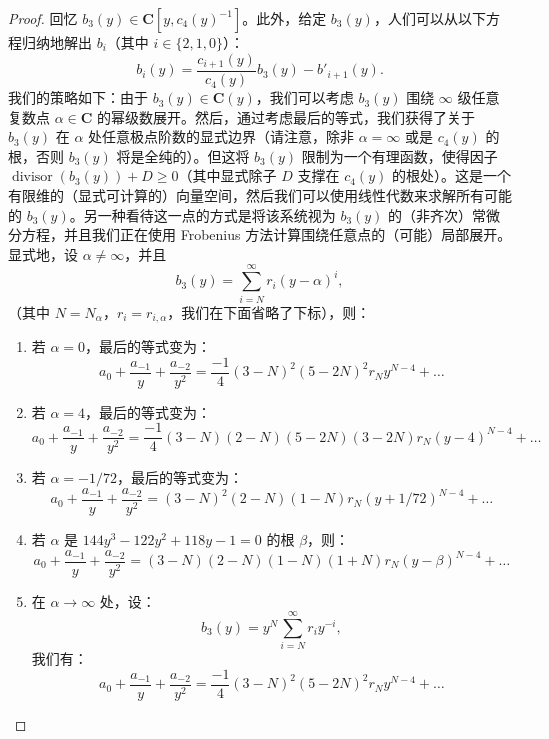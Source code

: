 \begin{proof}
回忆 $b_3(y) \in \mathbf{C}[y, c_4(y)^{-1}]$。此外，给定 $b_3(y)$，人们可以从以下方程归纳地解出 $b_i$（其中 $i \in \{2, 1, 0\}$）：
\[ b_i(y) = \frac{c_{i+1}(y)}{c_4(y)}b_3(y) - b'_{i+1}(y). \]
我们的策略如下：由于 $b_3(y) \in \mathbf{C}(y)$，我们可以考虑 $b_3(y)$ 围绕 $\infty$ 级任意复数点 $\alpha \in \mathbf{C}$ 的幂级数展开。然后，通过考虑最后的等式，我们获得了关于 $b_3(y)$ 在 $\alpha$ 处任意极点阶数的显式边界（请注意，除非 $\alpha = \infty$ 或是 $c_4(y)$ 的根，否则 $b_3(y)$ 将是全纯的）。但这将 $b_3(y)$ 限制为一个有理函数，使得因子 $\operatorname{divisor}(b_3(y)) + D \ge 0$（其中显式除子 $D$ 支撑在 $c_4(y)$ 的根处）。这是一个有限维的（显式可计算的）向量空间，然后我们可以使用线性代数来求解所有可能的 $b_3(y)$。另一种看待这一点的方式是将该系统视为 $b_3(y)$ 的（非齐次）常微分方程，并且我们正在使用 Frobenius 方法计算围绕任意点的（可能）局部展开。显式地，设 $\alpha \neq \infty$，并且
\[ b_3(y) = \sum_{i=N}^{\infty} r_i (y - \alpha)^i, \]
（其中 $N = N_{\alpha}$，$r_i = r_{i,\alpha}$，我们在下面省略了下标），则：
\begin{enumerate}
\item[(1)] 若 $\alpha = 0$，最后的等式变为：
\[ a_0 + \frac{a_{-1}}{y} + \frac{a_{-2}}{y^2} = \frac{-1}{4}(3-N)^2(5-2N)^2r_Ny^{N-4} + \dots \]
\item[(2)] 若 $\alpha = 4$，最后的等式变为：
\[ a_0 + \frac{a_{-1}}{y} + \frac{a_{-2}}{y^2} = \frac{-1}{4}(3-N)(2-N)(5-2N)(3-2N)r_N(y-4)^{N-4} + \dots \]
\item[(3)] 若 $\alpha = -1/72$，最后的等式变为：
\[ a_0 + \frac{a_{-1}}{y} + \frac{a_{-2}}{y^2} = (3 - N)^2 (2 - N)(1 - N)r_N (y + 1/72)^{N-4} + \dots \]
\item[(4)] 若 $\alpha$ 是 $144y^3 - 122y^2 + 118y - 1 = 0$ 的根 $\beta$，则：
\[ a_0 + \frac{a_{-1}}{y} + \frac{a_{-2}}{y^2} = (3 - N)(2 - N)(1 - N)(1 + N)r_N(y - \beta)^{N-4} + \dots \]
\item[(5)] 在 $\alpha \to \infty$ 处，设：
\[ b_3(y) = y^N \sum_{i=N}^{\infty} r_i y^{-i}, \]
我们有：
\[ a_0 + \frac{a_{-1}}{y} + \frac{a_{-2}}{y^2} = \frac{-1}{4}(3-N)^2(5-2N)^2r_Ny^{N-4} + \dots \]
\end{enumerate}


\end{proof}
